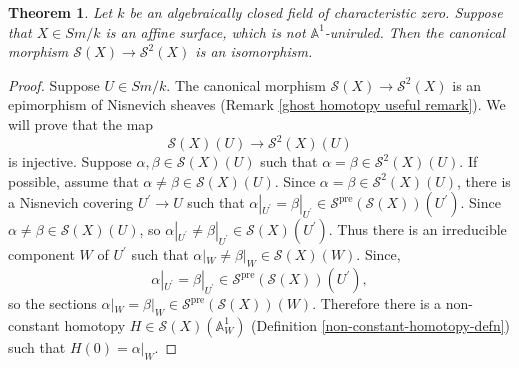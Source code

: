 \documentclass[11pt, reqno]{amsart}
\theoremstyle{plain}
\newtheorem{theorem}[thm]{Theorem}
\theoremstyle{definition}
\begin{document}
\begin{theorem} \label{non-uniruled}
Let $k$ be an algebraically closed field of characteristic zero. Suppose that $X \in Sm/k$ is an affine surface, which is not $\mathbb{A}^1$-uniruled. Then the canonical morphism $\mathcal{S}(X) \to \mathcal{S}^2(X)$ is an isomorphism.
\end{theorem}
\begin{proof}
Suppose $U \in Sm/k$. The canonical morphism $\mathcal{S}(X) \to \mathcal{S}^2(X)$ is an epimorphism of Nisnevich sheaves (Remark \ref{ghost homotopy useful remark}). We will prove that the map
$$\mathcal{S}(X)(U) \to \mathcal{S}^2(X)(U)$$
is injective. Suppose $\alpha, \beta \in \mathcal{S}(X)(U)$ such that $\alpha = \beta \in \mathcal{S}^2(X)(U)$. If possible, assume that $\alpha \neq \beta \in \mathcal{S}(X)(U)$. Since $\alpha = \beta \in \mathcal{S}^2(X)(U)$, there is a Nisnevich covering $U^\prime \to U$ such that $\alpha|_{U^\prime} = \beta|_{U^\prime} \in \mathcal{S}^{\text{pre}}(\mathcal{S}(X))(U^\prime)$. Since $\alpha \neq \beta \in \mathcal{S}(X)(U)$, so $\alpha|_{U^\prime} \neq \beta|_{U^\prime} \in \mathcal{S}(X)(U^\prime)$. 
Thus there is an irreducible component $W$ of $U^\prime$ such that $\alpha|_W \neq \beta|_W \in \mathcal{S}(X)(W)$. Since, 
$$\alpha|_{U^\prime} = \beta|_{U^\prime} \in \mathcal{S}^{\text{pre}}(\mathcal{S}(X))(U^\prime),$$
so the sections $\alpha|_W = \beta|_W \in \mathcal{S}^{\text{pre}}(\mathcal{S}(X))(W)$. Therefore there is a non-constant homotopy $H \in \mathcal{S}(X)(\mathbb{A}^1_W)$ (Definition \ref{non-constant-homotopy-defn}) such that $H(0) = \alpha|_W$. 

\end{proof}
\end{document}
